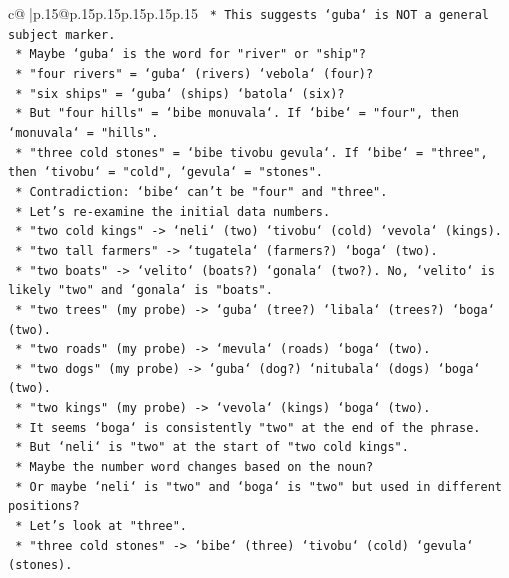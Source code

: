 \documentclass{article}
\begin{document}
{\begin{supertabular}{c@{$\;$}|p{.15\linewidth}@{}p{.15\linewidth}p{.15\linewidth}p{.15\linewidth}p{.15\linewidth}p{.15\linewidth}}
{{{\texttt{    *   This suggests `guba` is NOT a general subject marker.} \\
\texttt{    *   Maybe `guba` is the word for "river" or "ship"?} \\
\texttt{    *   "four rivers" = `guba` (rivers) `vebola` (four)?} \\
\texttt{    *   "six ships" = `guba` (ships) `batola` (six)?} \\
\texttt{    *   But "four hills" = `bibe monuvala`. If `bibe` = "four", then `monuvala` = "hills".} \\
\texttt{    *   "three cold stones" = `bibe tivobu gevula`. If `bibe` = "three", then `tivobu` = "cold", `gevula` = "stones".} \\
\texttt{    *   Contradiction: `bibe` can't be "four" and "three".} \\
\texttt{    *   Let's re{-}examine the initial data numbers.} \\
\texttt{        *   "two cold kings" {-}> `neli` (two) `tivobu` (cold) `vevola` (kings).} \\
\texttt{        *   "two tall farmers" {-}> `tugatela` (farmers?) `boga` (two).} \\
\texttt{        *   "two boats" {-}> `velito` (boats?) `gonala` (two?). No, `velito` is likely "two" and `gonala` is "boats".} \\
\texttt{        *   "two trees" (my probe) {-}> `guba` (tree?) `libala` (trees?) `boga` (two).} \\
\texttt{        *   "two roads" (my probe) {-}> `mevula` (roads) `boga` (two).} \\
\texttt{        *   "two dogs" (my probe) {-}> `guba` (dog?) `nitubala` (dogs) `boga` (two).} \\
\texttt{        *   "two kings" (my probe) {-}> `vevola` (kings) `boga` (two).} \\
\texttt{    *   It seems `boga` is consistently "two" at the end of the phrase.} \\
\texttt{    *   But `neli` is "two" at the start of "two cold kings".} \\
\texttt{    *   Maybe the number word changes based on the noun?} \\
\texttt{    *   Or maybe `neli` is "two" and `boga` is "two" but used in different positions?} \\
\texttt{    *   Let's look at "three".} \\
\texttt{        *   "three cold stones" {-}> `bibe` (three) `tivobu` (cold) `gevula` (stones).} \\
}}}
\end{supertabular}}
\end{document}
